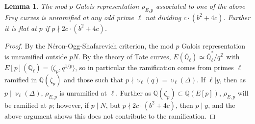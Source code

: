 \documentclass[12pt]{amsart}
\newtheorem{lem}[thm]{Lemma}
\theoremstyle{definition}
\def\Q{{\mathbb Q}}
\def\Z{{\mathbb Z}}
\renewcommand{\bar}{\overline}
\newcommand{\notdiv}{\nmid}
\begin{document}
\begin{lem}\label{unram}
The mod $p$ Galois representation $\rho_{E,p}$ associated to one of the above Frey curves is unramified at any odd prime $\ell$ not dividing $c \cdot (b^2+4c)$.  Further it is flat at $p$ if $p \notdiv 2c\cdot (b^2+4c)$.
\end{lem}
\begin{proof}
By the N\'{e}ron-Ogg-Shafarevich criterion, the mod $p$ Galois representation is unramified outside $pN$.  By the theory of Tate curves, $E(\bar{\Q}_\ell) \simeq \bar{\Q}_\ell^\ast / q^{\Z}$ with $E[p](\bar{\Q}_\ell) = \langle \zeta_p, q^{1/p} \rangle$, so in particular the ramification comes from primes $\ell$ ramified in $\Q(\zeta_p)$ and those such that $p \notdiv \upnu_\ell(q) = \upnu_\ell(\Delta)$.  If $\ell | y$, then as $p \mid \upnu_\ell(\Delta)$, $\rho_{E,p}$ is unramified at $\ell$.  Further as $\Q(\zeta_p) \subset \Q(E[p])$, $\rho_{E,p}$ will be ramified at $p$; however, if $p \mid N$, but $p \notdiv 2c \cdot (b^2+4c)$, then $p \mid y$, and the above argument shows this does not contribute to the ramification.
\end{proof}
\end{document}
